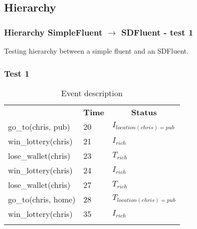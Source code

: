 \documentclass[8pt]{beamer}
\begin{document}
\subsection{Hierarchy}
\begin{frame}
    \frametitle{Hierarchy SimpleFluent $\rightarrow$ SDFluent - test 1}
    \small Testing hierarchy between a simple fluent and an SDFluent.\linebreak
    \subsubsection{Test 1}
    \begin{minipage}{0.48\linewidth}
        \begin{table}[t!]
            \caption{Event description}
            \begin{center}

                \begin{tabular}{lll}
                    \hline\noalign{\smallskip}
                    \multicolumn{1}{l}{\textbf{Event}} & \multicolumn{1}{c}{\textbf{Time}} & \multicolumn{1}{c}{\textbf{Status}}  \\
                    go\_to(chris, pub)& 20 & $I_{location(chris)=pub}$\\
                    win\_lottery(chris)&21 &$I_{rich}$\\
                    lose\_wallet(chris)& 23 &$T_{rich}$\\
                    win\_lottery(chris)& 24 &$I_{rich}$\\
                    lose\_wallet(chris)& 27 &$T_{rich}$\\
                    go\_to(chris, home)& 28 &$T_{location(chris)=pub}$\\
                    win\_lottery(chris)& 35&$I_{rich}$\\
                    \noalign{\smallskip}
                    \hline
                \end{tabular}
            \end{center}
        \end{table}
    \end{minipage}
    \begin{minipage}{0.48\linewidth}


\end{minipage}
\end{frame}
\end{document}
